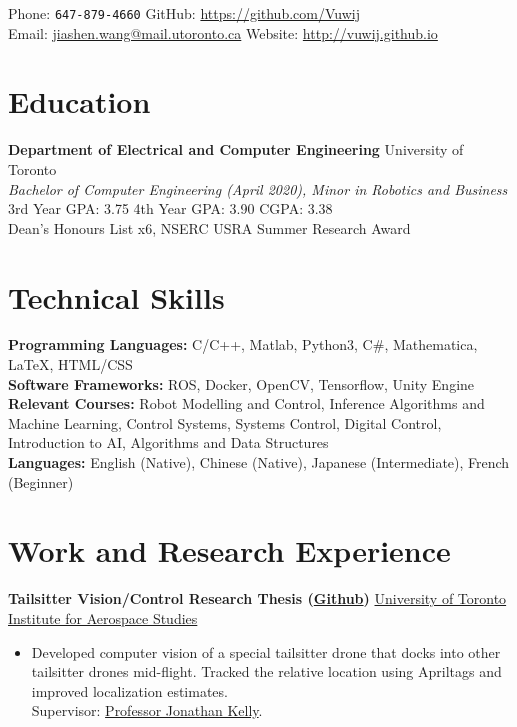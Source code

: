 \documentclass[10pt, a4paper]{cv}
\renewcommand*{\name}{\fontsize{24}{40}\mdseries\upshape}
\begin{document}
\begin{center}
\name{Jason Wang}
\end{center}

Phone: \texttt{647-879-4660} \hfill
GitHub: \href{https://github.com/Vuwij}{https://github.com/Vuwij}\\
Email: \href{mailto:jiashen.wang@mail.utoronto.ca}{jiashen.wang@mail.utoronto.ca}\hfill
Website: \href{http://vuwij.github.io}{http://vuwij.github.io}

\section*{Education}
\textbf{Department of Electrical and Computer Engineering} \hfill University of Toronto\\
\emph{Bachelor of Computer Engineering (April 2020), Minor in Robotics and Business}\\
\small{
	3rd Year GPA: 3.75\hspace{1em}
	4th Year GPA: 3.90\hspace{1em}
	CGPA: 3.38}\\[0.1mm]
\small Dean's Honours List x6, NSERC USRA Summer Research Award

\section*{Technical Skills}
\textbf{Programming Languages:} C/C++, Matlab, Python3, C\#, Mathematica, \LaTeX, HTML/CSS\\[0.2em]
\textbf{Software Frameworks:} ROS, Docker, OpenCV, Tensorflow, Unity Engine\\[0.2em]
\textbf{Relevant Courses:} Robot Modelling and Control, Inference Algorithms and Machine Learning, Control Systems, Systems Control, Digital Control, Introduction to AI, Algorithms and Data Structures \\
\textbf{Languages:} English (Native), Chinese (Native), Japanese (Intermediate), French (Beginner)
\section*{Work and Research Experience}\noindent
	\textbf{Tailsitter Vision/Control Research Thesis (\href{https://github.com/utiasSTARS/hummingbird_ws}{Github})} \hfill \href{http://www.starslab.ca}{University of Toronto Institute for Aerospace Studies}
	\begin{itemize}
	\item Developed computer vision of a special tailsitter drone that docks into other tailsitter drones mid-flight. Tracked the relative location using Apriltags and improved localization estimates. \\Supervisor: \href{http://stars.utias.utoronto.ca/~jkelly/}{Professor Jonathan Kelly}.
	\end{itemize}
\end{document}
